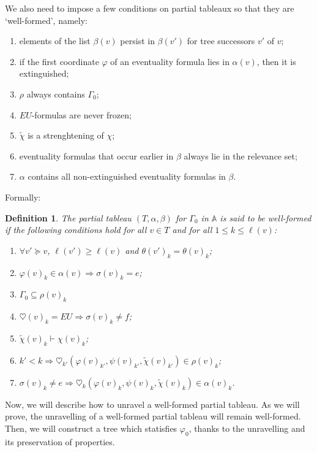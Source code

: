 \documentclass[11pt]{article}
\newcommand{\A}{{\mathbb A}}
\newtheorem{definition}{Definition}[section]
\begin{document}
We also need to impose a few conditions on partial tableaux so that they are `well-formed', namely:
\begin{enumerate}[label=(\alph*)]
    \setlength\itemsep{0em}
    \item elements of the list $\beta(v)$ persist in $\beta(v')$ for tree successors $v'$ of $v$;
    \item if the first coordinate $\varphi$ of an eventuality formula lies in $\alpha(v)$, then it is extinguished;
    \item $\rho$ always contains $\Gamma_0$; 
    \item $EU$-formulas are never frozen;
    \item $\tilde{\chi}$ is a strenghtening of $\chi$;
    \item eventuality formulas that occur earlier in $\beta$ always lie in the relevance set;
    \item $\alpha$ contains all non-extinguished eventuality formulas in $\beta$.
\end{enumerate}

Formally:
\begin{definition}\label{well_formed_partial_tableau}
    The partial tableau $(T,\alpha,\beta)$ for $\Gamma_0$ in $\A$ is said to be \emph{well-formed} if the following conditions hold for all $v\in T$ and for all $1\leq k\leq \ell(v)$:
    \begin{enumerate}[label=(\alph*)]
        \setlength\itemsep{0em}
        \item $\forall v'\succeq v$, $\ell(v')\geq\ell(v)$ and $\theta(v')_k = \theta(v)_k$;
        \item $\varphi(v)_k\in\alpha(v)\Rightarrow\sigma(v)_k=e$;
        \item $\Gamma_0\subseteq\rho(v)_k$
        \item $\heartsuit(v)_k=EU \Rightarrow \sigma(v)_k\not=f$;
        \item $\tilde{\chi}(v)_k\vdash\chi(v)_k$;
        \item $k'<k\Rightarrow\heartsuit_{k'}(\varphi(v)_{k'},\psi(v)_{k'},\tilde{\chi}(v)_{k'})\in\rho(v)_k$;
        \item $\sigma(v)_k\not=e\Rightarrow\heartsuit_{k}(\varphi(v)_{k},\psi(v)_{k},\tilde{\chi}(v)_{k})\in\alpha(v)_k$.
    \end{enumerate}
\end{definition}

Now, we will describe how to unravel a well-formed partial tableau. As we will prove, the unravelling of a well-formed partial tableau will remain well-formed. Then, we will construct a tree which statisfies $\varphi_0$, thanks to the unravelling and its preservation of properties.
\end{document}
